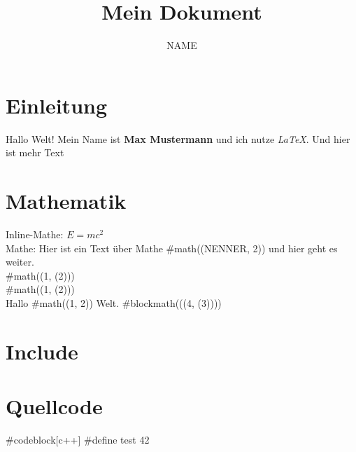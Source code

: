 \documentclass{article}
\title{Mein Dokument}
\author{NAME}
\begin{document}
\maketitle

\section{Einleitung}
Hallo Welt! 
Mein Name ist \textbf{Max Mustermann} und ich nutze \textit{LaTeX}.
Und hier ist mehr Text

\section{Mathematik}
Inline-Mathe: $E = mc^2$  \\
Mathe: Hier ist ein Text über Mathe #math(\frac(NENNER, 2)) und hier geht es weiter.\\  

#math(\frac(1, \sqrt(2))) \\

#math(\pow(1, \sqrt(2))) \\

Hallo #math(\frac(1, 2)) Welt.  
#blockmath(\sqrt(\frac(4, \abs(3))))

\section{Include}


\section{Quellcode}

#codeblock[c++]{
#define test 42
}
\end{document}
